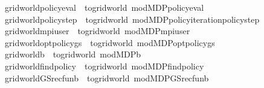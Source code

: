 \begin{isabellebody}
\isanewline
{}\isamarkupfalse%
\ {\isachardoublequoteopen}gridworld{\isacharunderscore}{\kern0pt}policy{\isacharunderscore}{\kern0pt}eval{\isacharprime}{\kern0pt}\ {\isasymequiv}\ to{\isacharunderscore}{\kern0pt}gridworld\ mod{\isacharunderscore}{\kern0pt}MDP{\isacharunderscore}{\kern0pt}policy{\isacharunderscore}{\kern0pt}eval{\isacharprime}{\kern0pt}{\isachardoublequoteclose}\isanewline
{}\isamarkupfalse%
\ {\isachardoublequoteopen}gridworld{\isacharunderscore}{\kern0pt}policy{\isacharunderscore}{\kern0pt}step{\isacharprime}{\kern0pt}\ {\isasymequiv}\ to{\isacharunderscore}{\kern0pt}gridworld{\isacharprime}{\kern0pt}\ mod{\isacharunderscore}{\kern0pt}MDP{\isacharunderscore}{\kern0pt}policy{\isacharunderscore}{\kern0pt}iteration{\isacharunderscore}{\kern0pt}policy{\isacharunderscore}{\kern0pt}step{\isacharprime}{\kern0pt}{\isachardoublequoteclose}\isanewline
{}\isamarkupfalse%
\ {\isachardoublequoteopen}gridworld{\isacharunderscore}{\kern0pt}mpi{\isacharunderscore}{\kern0pt}user\ {\isasymequiv}\ to{\isacharunderscore}{\kern0pt}gridworld{\isacharprime}{\kern0pt}\ mod{\isacharunderscore}{\kern0pt}MDP{\isacharunderscore}{\kern0pt}mpi{\isacharunderscore}{\kern0pt}user{\isachardoublequoteclose}\isanewline
{}\isamarkupfalse%
\ {\isachardoublequoteopen}gridworld{\isacharunderscore}{\kern0pt}opt{\isacharunderscore}{\kern0pt}policy{\isacharunderscore}{\kern0pt}gs\ {\isasymequiv}\ to{\isacharunderscore}{\kern0pt}gridworld{\isacharprime}{\kern0pt}\ mod{\isacharunderscore}{\kern0pt}MDP{\isacharunderscore}{\kern0pt}opt{\isacharunderscore}{\kern0pt}policy{\isacharunderscore}{\kern0pt}gs{\isachardoublequoteclose}\isanewline
{}\isamarkupfalse%
\ {\isachardoublequoteopen}gridworld{\isacharunderscore}{\kern0pt}{\isasymL}\isactrlsub b\ {\isasymequiv}\ to{\isacharunderscore}{\kern0pt}gridworld{\isacharprime}{\kern0pt}\ mod{\isacharunderscore}{\kern0pt}MDP{\isacharunderscore}{\kern0pt}{\isasymL}\isactrlsub b{\isachardoublequoteclose}\isanewline
{}\isamarkupfalse%
\ {\isachardoublequoteopen}gridworld{\isacharunderscore}{\kern0pt}find{\isacharunderscore}{\kern0pt}policy{\isacharprime}{\kern0pt}\ {\isasymequiv}\ to{\isacharunderscore}{\kern0pt}gridworld{\isacharprime}{\kern0pt}\ mod{\isacharunderscore}{\kern0pt}MDP{\isacharunderscore}{\kern0pt}find{\isacharunderscore}{\kern0pt}policy{\isacharprime}{\kern0pt}{\isachardoublequoteclose}\isanewline
{}\isamarkupfalse%
\ {\isachardoublequoteopen}gridworld{\isacharunderscore}{\kern0pt}GS{\isacharunderscore}{\kern0pt}rec{\isacharunderscore}{\kern0pt}fun\isactrlsub b\ {\isasymequiv}\ to{\isacharunderscore}{\kern0pt}gridworld{\isacharprime}{\kern0pt}\ mod{\isacharunderscore}{\kern0pt}MDP{\isacharunderscore}{\kern0pt}GS{\isacharunderscore}{\kern0pt}rec{\isacharunderscore}{\kern0pt}fun\isactrlsub b{\isachardoublequoteclose}\isanewline

\end{isabellebody}
